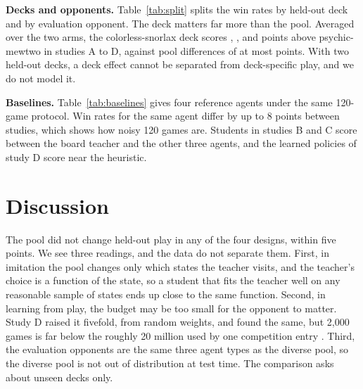 \documentclass[conference]{IEEEtran}
\begin{document}
\textbf{Decks and opponents.} Table~\ref{tab:split} splits the win rates by held-out deck and by evaluation opponent. The deck matters far more than the pool. Averaged over the two arms, the colorless-snorlax deck scores \ADeckGap, \BDeckGap, \CDeckGap{} and \DDeckGap{} points above psychic-mewtwo in studies A to D, against pool differences of at most \MaxDelta{} points. With two held-out decks, a deck effect cannot be separated from deck-specific play, and we do not model it.

\begin{table}[t]
\caption{Mean win rate (\%) by held-out deck and by evaluation opponent, over 30 seeds per arm.}
\label{tab:split}
\centering
\small
\setlength{\tabcolsep}{3.5pt}

\end{table}

\textbf{Baselines.} Table~\ref{tab:baselines} gives four reference agents under the same 120-game protocol. Win rates for the same agent differ by up to 8 points between studies, which shows how noisy 120 games are. Students in studies B and C score between the board teacher and the other three agents, and the learned policies of study D score near the heuristic.

\begin{table}[t]
\caption{Win rate (\%) of reference agents on the held-out decks, 120 games each, same protocol as the students. Study A did not include the board agent.}
\label{tab:baselines}
\centering
\small

\end{table}

\section{Discussion}

The pool did not change held-out play in any of the four designs, within five points. We see three readings, and the data do not separate them. First, in imitation the pool changes only which states the teacher visits, and the teacher's choice is a function of the state, so a student that fits the teacher well on any reasonable sample of states ends up close to the same function. Second, in learning from play, the budget may be too small for the opponent to matter. Study D raised it fivefold, from random weights, and found the same, but 2,000 games is far below the roughly 20 million used by one competition entry \cite{Kaggle20th}. Third, the evaluation opponents are the same three agent types as the diverse pool, so the diverse pool is not out of distribution at test time. The comparison asks about unseen decks only.
\end{document}
